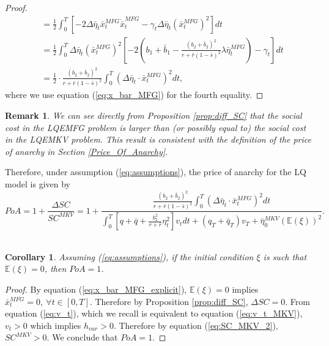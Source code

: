 \documentclass[11pt]{article}
\newtheorem{remark}{Remark}
\newtheorem{corollary}{Corollary}
\begin{document}
\begin{proof}
\begin{equation*}
\begin{split}
			&= \frac{1}{2}\int_0^T \left[- 2\Delta{\bar{\eta}}_t \bar{x}_t^{MFG} \dot{\bar{x}}_t^{MFG} - \gamma_t \Delta{\bar{\eta}}_t (\bar{x}_t^{MFG})^2 \right]dt \\
			&= \frac{1}{2} \int_0^T \Delta{\bar{\eta}}_t (\bar{x}_t^{MFG})^2 \left[-2\left(b_1 + \bar{b}_1 - \frac{(b_2+\bar{b}_2)^2}{r + \bar{r}(1-\bar{s})^2} \lambda \bar{\eta}_t^{MFG}\right) - \gamma_t\right] dt\\
			&= \frac{1}{2}\cdot \frac{(b_2 + \bar{b}_2)^2}{r + \bar{r}(1-\bar{s})^2} \int_0^T (\Delta \bar{\eta}_t \cdot \bar{x}_t^{MFG})^2 dt,
		\end{split}
	\end{equation*}
	where we use equation (\ref{eq:x_bar_MFG}) for the fourth equality.	
	
\end{proof}

\begin{remark}
	We can see directly from Proposition \ref{prop:diff_SC} that the social cost in the LQEMFG problem is larger than (or possibly equal to) the social cost in the LQEMKV problem. This result is consistent with the definition of the price of anarchy in Section \ref{Price_Of_Anarchy}.
\end{remark}

Therefore, under assumption (\ref{eq:assumptions}), the price of anarchy for the LQ model is given by 
\begin{equation}
PoA =1+ \frac{\Delta SC}{SC^{MKV}}= 1 +  \frac{ \displaystyle   \frac{(b_2 + \bar{b}_2)^2}{r + \bar{r}(1-\bar{s})^2}  \int_0^T (\Delta \bar{\eta}_t \cdot \bar{x}_t^{MFG})^2 dt }{\displaystyle \int_0^T \left[q+\bar{q} + \frac{b_2^2}{r+\bar{r}} \eta_t^2 \right] v_t dt + (q_T + \bar{q}_T) v_T + \bar{\eta}_0^{MKV} (\mathbb{E}(\xi))^2}.
\label{eq:PoA_LQ}
\end{equation}\\

\begin{corollary}
    Assuming (\ref{eq:assumptions}), if the initial condition $\xi$ is such that $\mathbb{E}(\xi)=0$, then $PoA=1$.
\end{corollary}
\begin{proof}
    By equation (\ref{eq:x_bar_MFG_explicit}), $\mathbb{E}(\xi)=0$ implies $\bar{x}^{MFG}_t=0,\ \forall t \in [0,T]$. Therefore by Proposition \ref{prop:diff_SC}, $\Delta SC=0$. From equation (\ref{eq:v_t}), which we recall is equivalent to equation (\ref{eq:v_t_MKV}), $v_t>0$ which implies $h_{var}>0$. Therefore by equation (\ref{eq:SC_MKV_2}), $SC^{MKV}>0$. We conclude that $PoA=1$.
\end{proof}
\end{document}
